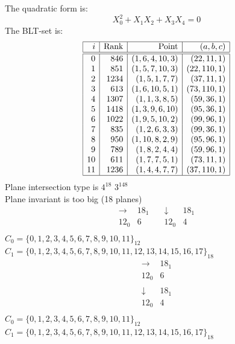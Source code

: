 The quadratic form is: 
$$
X_0^2 + X_1X_2 + X_3X_4 = 0$$
The BLT-set is:\\
$$
\begin{array}{|r|r|r|r|}
\hline
i & \mbox{Rank} & \mbox{Point} & (a,b,c) \\
\hline
\hline
0 & 846 & ( 1, 6, 4, 10, 3 ) & (22, 11, 1)\\
1 & 851 & ( 1, 5, 7, 10, 3 ) & (22, 110, 1)\\
2 & 1234 & ( 1, 5, 1, 7, 7 ) & (37, 11, 1)\\
3 & 613 & ( 1, 6, 10, 5, 1 ) & (73, 110, 1)\\
4 & 1307 & ( 1, 1, 3, 8, 5 ) & (59, 36, 1)\\
5 & 1418 & ( 1, 3, 9, 6, 10 ) & (95, 36, 1)\\
6 & 1022 & ( 1, 9, 5, 10, 2 ) & (99, 96, 1)\\
7 & 835 & ( 1, 2, 6, 3, 3 ) & (99, 36, 1)\\
8 & 950 & ( 1, 10, 8, 2, 9 ) & (95, 96, 1)\\
9 & 789 & ( 1, 8, 2, 4, 4 ) & (59, 96, 1)\\
10 & 611 & ( 1, 7, 7, 5, 1 ) & (73, 11, 1)\\
11 & 1236 & ( 1, 4, 4, 7, 7 ) & (37, 110, 1)\\
\hline
\end{array}
$$
Plane intersection type is $4^{18}$ $3^{148}$ \\
Plane invariant is too big (18 planes)\\
$$
\begin{array}{r|*{1}{r}}
\rightarrow  &     18_{  1}\\
\hline
    12_{  0} &            6\\
\end{array}
\quad
\begin{array}{r|*{1}{r}}
\downarrow  &     18_{  1}\\
\hline
    12_{  0} &            4\\
\end{array}
$$
$C_{0} = \{ 0, 1, 2, 3, 4, 5, 6, 7, 8, 9, 10, 11 \}_{12}
$\\
$C_{1} = \{ 0, 1, 2, 3, 4, 5, 6, 7, 8, 9, 10, 11, 12, 13, 14, 15, 16, 17 \}_{18}
$\\
$$
\begin{array}{r|*{1}{r}}
\rightarrow  &     18_{  1}\\
\hline
    12_{  0} &            6\\
\end{array}
$$
$$
\begin{array}{r|*{1}{r}}
\downarrow  &     18_{  1}\\
\hline
    12_{  0} &            4\\
\end{array}
$$
$C_{0} = \{ 0, 1, 2, 3, 4, 5, 6, 7, 8, 9, 10, 11 \}_{12}
$\\
$C_{1} = \{ 0, 1, 2, 3, 4, 5, 6, 7, 8, 9, 10, 11, 12, 13, 14, 15, 16, 17 \}_{18}
$\\
